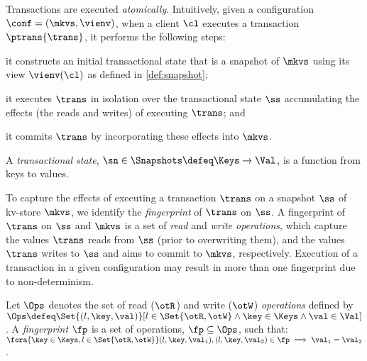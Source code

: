 Transactions are executed \emph{atomically}. 
Intuitively, given a configuration $\conf = (\mkvs, \vienv)$, 
when a client $\cl$ executes a transaction $\ptrans{\trans}$, 
it performs the following steps: 
\begin{enumerate*}
	\item it constructs an initial transactional state that is a snapshot of $\mkvs$ using its view $\vienv(\cl)$ as defined in \cref{def:snapshot};  
	\item it executes $\trans$ in isolation over the transactional state $\ss$
        accumulating the effects (the reads and writes) of executing $\trans$; and
	\item it commits $\trans$ by incorporating these effects into $\mkvs$.
\end{enumerate*}

\begin{definition}
\label{def:heaps}
A \emph{transactional state}, \( \sn \in \Snapshots \defeq \Keys \to
\Val\),  is a function from keys to values.
\end{definition}


To capture the effects of executing a transaction $\trans$ on a snapshot $\ss$ of kv-store $\mkvs$, 
we identify the \emph{fingerprint} of $\trans$ on $\ss$.
A fingerprint of $\trans$ on $\ss$ and $\mkvs$
is a set of \emph{read} and \emph{write operations}, which 
capture the values $\trans$ reads from $\ss$ (prior to overwriting them), and
the values $\trans$ writes to $\ss$ and aims to commit to $\mkvs$, respectively. 
Execution of a transaction in a given configuration may result in more than one fingerprint due to non-determinism. 

\begin{definition}[Fingerprints]
\label{beebop}
\label{def:fingerprint}
Let \( \Ops\) denotes the set of read (\( \otR\)) and write (\(\otW\)) \emph{operations} defined by 
$\Ops \defeq \Set{(l, \key, \val) }[ l \in \Set{\otR, \otW} \land \key \in \Keys \land \val \in \Val ]$.
A \emph{fingerprint} $\fp$ is a set of operations, $\fp \subseteq \Ops$,
such that: 
$\fora{\key \in \Keys, l  \in \Set{\otR, \otW}}
	(l, \key, \val_1), (l, \key, \val_2) \in \fp \implies \val_1 = \val_2$.
\end{definition}

